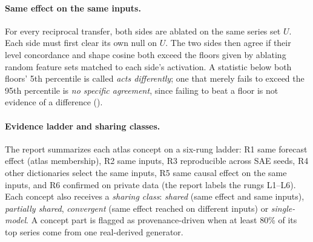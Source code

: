 \paragraph{Same effect on the same inputs.} For every reciprocal transfer, both sides are ablated on the same series set
$U$. Each side must first clear its own null on $U$. The two sides then agree if their level concordance and shape
cosine both exceed the floors given by ablating random feature sets matched to each side's activation. A statistic
below both floors' 5th percentile is called \emph{acts differently}; one that merely fails to exceed the 95th
percentile is \emph{no specific agreement}, since failing to beat a floor is not evidence of a difference ().

\paragraph{Evidence ladder and sharing classes.} The report summarizes each atlas concept on a six-rung ladder: R1 same
forecast effect (atlas membership), R2 same inputs, R3 reproducible across SAE seeds, R4 other dictionaries select the
same inputs, R5 same causal effect on the same inputs, and R6 confirmed on private data (the report labels the rungs L1--L6). Each concept also receives a
\emph{sharing class}: \emph{shared} (same effect and same inputs), \emph{partially shared}, \emph{convergent} (same
effect reached on different inputs) or \emph{single-model}. A concept part is flagged as provenance-driven when at least
80\% of its top series come from one real-derived generator.
